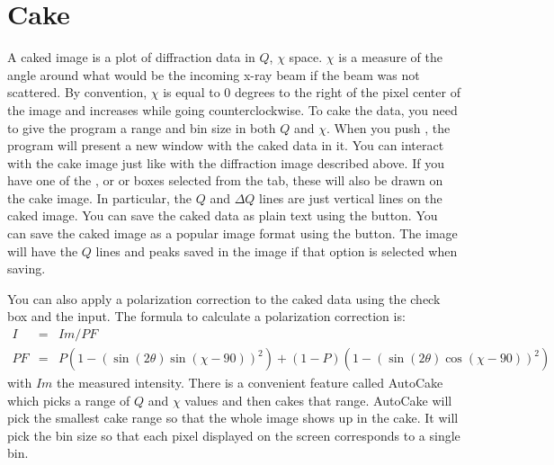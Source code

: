 \section{Cake}
\index{$\chi$}
A caked image is a plot of diffraction data in $Q$, 
$\chi$ space. $\chi$ is a measure of the angle around 
what would be the incoming x-ray beam if the beam was 
not scattered. By convention, $\chi$ is equal to 0
degrees to the right of the pixel center of the image 
and increases while going counterclockwise. To cake the
data, you need to give the program a range and bin size 
in both $Q$ and $\chi$. When you push , the
program will present a new window with the caked data in
it. You can interact with the cake image just like with
the diffraction image described above. If you have one of
the , or  or 
 boxes selected from the  
tab, these will also be drawn on the cake image. In particular,
the $Q$ and $\Delta Q$ lines are just vertical lines on the
caked image. You can save the caked data as plain text 
using the  button. You can save the caked 
image as a popular image format using the 
button. The image will have the $Q$ lines and peaks saved
in the image if that option is selected when saving.

You can also apply a polarization correction to the caked
data using the  check box
and the  input. The formula to calculate a 
polarization correction is:
\begin{eqnarray}
    I&=&Im/PF \\ 
    PF&=&P(1 - (\sin(2\theta)\sin(\chi-90))^2) + 
    (1 - P)(1 - (\sin(2\theta)\cos(\chi-90))^2)
\end{eqnarray}
with $Im$ the measured intensity. There is a convenient
feature called AutoCake which picks a range of $Q$ and $\chi$ 
values and then cakes that range. AutoCake will pick the
smallest cake range so that the whole image shows up in
the cake. It will pick the bin size so that each pixel 
displayed on the screen corresponds to a single bin.

